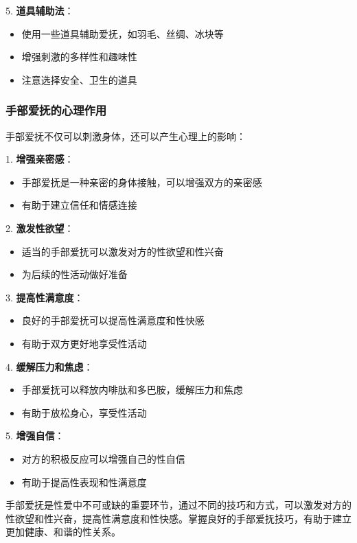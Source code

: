 \documentclass[12pt,UTF8]{ctexbook}
\begin{document}
5. \textbf{道具辅助法}：
  \begin{itemize}
  \item 使用一些道具辅助爱抚，如羽毛、丝绸、冰块等
  \item 增强刺激的多样性和趣味性
  \item 注意选择安全、卫生的道具
  \end{itemize}

\subsubsection{手部爱抚的心理作用}

手部爱抚不仅可以刺激身体，还可以产生心理上的影响：

1. \textbf{增强亲密感}：
  \begin{itemize}
  \item 手部爱抚是一种亲密的身体接触，可以增强双方的亲密感
  \item 有助于建立信任和情感连接
  \end{itemize}

2. \textbf{激发性欲望}：
  \begin{itemize}
  \item 适当的手部爱抚可以激发对方的性欲望和性兴奋
  \item 为后续的性活动做好准备
  \end{itemize}

3. \textbf{提高性满意度}：
  \begin{itemize}
  \item 良好的手部爱抚可以提高性满意度和性快感
  \item 有助于双方更好地享受性活动
  \end{itemize}

4. \textbf{缓解压力和焦虑}：
  \begin{itemize}
  \item 手部爱抚可以释放内啡肽和多巴胺，缓解压力和焦虑
  \item 有助于放松身心，享受性活动
  \end{itemize}

5. \textbf{增强自信}：
  \begin{itemize}
  \item 对方的积极反应可以增强自己的性自信
  \item 有助于提高性表现和性满意度
  \end{itemize}

手部爱抚是性爱中不可或缺的重要环节，通过不同的技巧和方式，可以激发对方的性欲望和性兴奋，提高性满意度和性快感。掌握良好的手部爱抚技巧，有助于建立更加健康、和谐的性关系。
\end{document}
